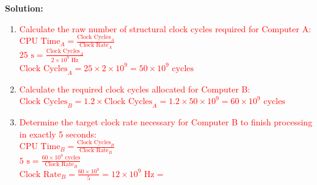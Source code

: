 \documentclass[letterpaper]{report}
\begin{document}
{\color{red} \textbf{Solution:}}
\begin{enumerate}
    \item \textcolor{red}{Calculate the raw number of structural clock cycles required for Computer A:} \\
   \textcolor{red}{\(\text{CPU Time}_A = \frac{\text{Clock Cycles}_A}{\text{Clock Rate}_A}\)} \\
   \textcolor{red}{\(25 \text{ s} = \frac{\text{Clock Cycles}_A}{2 \times 10^9 \text{ Hz}}\)} \\
   \textcolor{red}{\(\text{Clock Cycles}_A = 25 \times 2 \times 10^9 = 50 \times 10^9 \text{ cycles}\)}
   
   \item \textcolor{red}{Calculate the required clock cycles allocated for Computer B:} \\
   \textcolor{red}{\(\text{Clock Cycles}_B = 1.2 \times \text{Clock Cycles}_A = 1.2 \times 50 \times 10^9 = 60 \times 10^9 \text{ cycles}\)}
   
   \item \textcolor{red}{Determine the target clock rate necessary for Computer B to finish processing in exactly 5 seconds:} \\
   \textcolor{red}{\(\text{CPU Time}_B = \frac{\text{Clock Cycles}_B}{\text{Clock Rate}_B}\)} \\
   \textcolor{red}{\(5 \text{ s} = \frac{60 \times 10^9 \text{ cycles}}{\text{Clock Rate}_B}\)} \\
   \textcolor{red}{\(\text{Clock Rate}_B = \frac{60 \times 10^9}{5} = 12 \times 10^9 \text{ Hz} =\)} 
\end{enumerate}
\ep
\vf
\newpage
\end{document}
